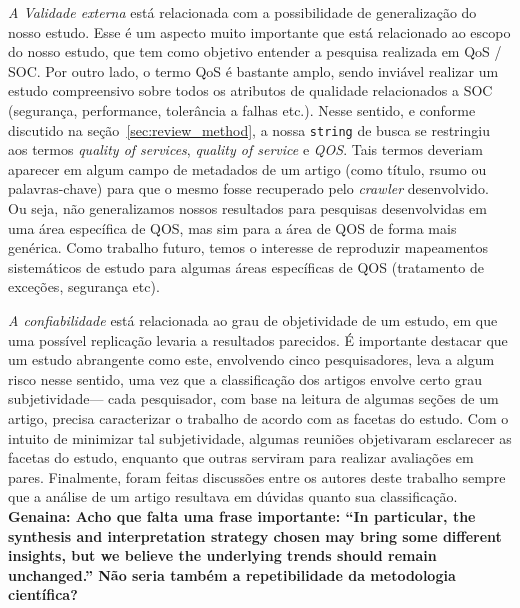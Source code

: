 \noindent
\emph{A Validade externa} est\'{a} relacionada com a possibilidade de
generaliza\c c\~{a}o do nosso estudo. Esse \'{e} um aspecto muito
importante que est\'{a} relacionado ao escopo do nosso estudo, que tem
como objetivo entender a pesquisa realizada em QoS / SOC. Por outro
lado, o termo QoS \'{e} bastante amplo, sendo invi\'{a}vel realizar
um estudo compreensivo sobre todos os atributos de qualidade
relacionados a SOC (seguran\c ca, performance, toler\^{a}ncia a falhas
etc.). Nesse sentido, e conforme discutido na se\c c\~{a}o~\ref{sec:review_method}, a
nossa \texttt{string} de busca se restringiu aos termos \emph{quality
  of services}, \emph{quality of service} e \emph{QOS}. Tais termos
deveriam aparecer em algum campo de metadados de um artigo (como
t\'{i}tulo, rsumo ou palavras-chave) para que o mesmo fosse recuperado pelo
\emph{crawler} desenvolvido. Ou seja, n\~{a}o generalizamos nossos
resultados para pesquisas desenvolvidas em uma \'{a}rea espec\'{i}fica de
QOS, mas sim para a \'{a}rea de QOS de forma mais gen\'{e}rica. Como
trabalho futuro, temos
o interesse de reproduzir mapeamentos sistem\'{a}ticos de estudo para
algumas \'{a}reas espec\'{i}ficas de QOS (tratamento de exce\c
c\~{o}es, seguran\c ca etc). 

\noindent
\emph{A confiabilidade} est\'{a} relacionada ao grau de objetividade de
um estudo, em que uma poss\'{i}vel replica\c c\~{a}o levaria a
resultados parecidos. \'{E} importante destacar que um estudo abrangente como este,
envolvendo cinco pesquisadores, leva a algum risco nesse sentido,
uma vez que a classifica\c c\~{a}o dos artigos envolve certo grau
subjetividade--- cada pesquisador, com base na leitura de algumas
se\c c\~{o}es de um artigo, precisa caracterizar o trabalho de acordo
com as facetas do estudo. Com o intuito de minimizar tal subjetividade,
algumas reuni\~{o}es objetivaram esclarecer as facetas do estudo,
enquanto que outras serviram para realizar avalia\c c\~{o}es em
pares. Finalmente, foram feitas discuss\~{o}es entre os autores deste
trabalho sempre que a an\'{a}lise de um artigo resultava em d\'{u}vidas
quanto sua classifica\c c\~{a}o. \textbf{Genaina: Acho que falta uma frase importante: ``In particular, the synthesis and interpretation strategy chosen may bring some different insights, but we believe the underlying trends should remain unchanged.'' N\~{a}o seria também a repetibilidade da metodologia cient\'{i}fica?}